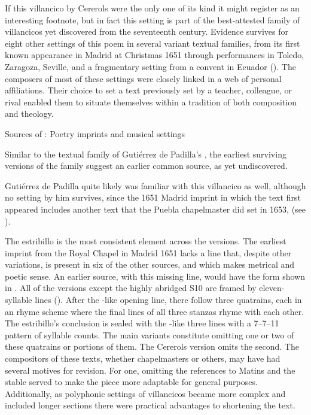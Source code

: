 If this villancico by Cererols were the only one of its kind it might register
as an interesting footnote, but in fact this setting is part of the
best-attested family of villancicos yet discovered from the seventeenth century.
Evidence survives for eight other settings of this poem in several variant
textual families, from its first known appearance in Madrid at Christmas 1651
through performances in Toledo, Zaragoza, Seville, and a fragmentary setting
from a convent in Ecuador ().
The composers of most of these settings were closely linked in a web of personal
affiliations.
Their choice to set a text previously set by a teacher, colleague, or rival
enabled them to situate themselves within a tradition of both composition and
theology.


{Sources of : Poetry imprints and
musical settings}

Similar to the textual family of Gutiérrez de Padilla's , the
earliest surviving versions of the  family suggest an
earlier common source, as yet undiscovered.%
\begin{Footnote}
    Gutiérrez de Padilla quite likely was familiar with this villancico as
    well, although no setting by him survives, since the 1651 Madrid imprint
    in which the text first appeared includes another text that the Puebla
    chapelmaster did set in 1653,  (see
    ).
\end{Footnote}
The  estribillo is the most consistent element across
the versions.
The earliest imprint from the Royal Chapel in Madrid 1651 lacks a line that,
despite other variations, is present in six of the other sources, and which
makes metrical and poetic sense.
An earlier source, with this missing line, would have the form shown in
.
All of the versions except the highly abridged S10 are framed by eleven-syllable
lines ().
After the -like opening line, there follow three quatrains, each
in an  rhyme scheme where the final lines of all three stanzas rhyme
with each other.
The estribillo's conclusion is sealed with the -like three lines with
a 7--7--11 pattern of syllable counts.
The main variants constitute omitting one or two of these quatrains or portions
of them.
The Cererols version omits the second.
The compositors of these texts, whether chapelmasters or others, may have had
several motives for revision.
For one, omitting the references to Matins  and the stable
served to make the piece more adaptable for general purposes. 
Additionally, as polyphonic settings of villancicos became more complex and
included longer sections there were practical advantages to shortening the
text.

